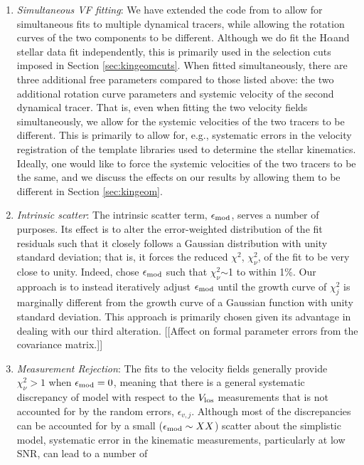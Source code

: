 \documentclass[apj,iop,revtex4,numberedappendix]{emulateapj}
\newcommand{\halpha}{H$\alpha$}
\begin{document}
\begin{enumerate}
%
\item {\em Simultaneous VF fitting}:  We have extended the code from
\citet{2013ApJ...768...41A} to allow for simultaneous fits to multiple
dynamical tracers, while allowing the rotation curves of the two
components to be different.  Although we do fit the \halpha and stellar
data fit independently, this is primarily used in the selection cuts
imposed in Section \ref{sec:kingeomcuts}.  When fitted simultaneously,
there are three additional free parameters compared to those listed
above: the two additional rotation curve parameters and systemic
velocity of the second dynamical tracer.  That is, even when fitting the
two velocity fields simultaneously, we allow for the systemic velocities
of the two tracers to be different.  This is primarily to allow for,
e.g., systematic errors in the velocity registration of the template
libraries used to determine the stellar kinematics.  Ideally, one would
like to force the systemic velocities of the two tracers to be the same,
and we discuss the effects on our results by allowing them to be
different in Section \ref{sec:kingeom}.
%
\item{\em Intrinsic scatter}:  The intrinsic scatter term,
$\epsilon_{\rm mod}$, serves a number of purposes.  Its effect is to
alter the error-weighted distribution of the fit residuals such that it
closely follows a Gaussian distribution with unity standard deviation;
that is, it forces the reduced $\chi^2$, $\chi^2_\nu$, of the fit to be
very close to unity.  Indeed, \citet{2013ApJ...768...41A} chose
$\epsilon_{\rm mod}$ such that $\chi^2_\nu$$\sim$1 to within 1\%.  Our
approach is to instead iteratively adjust $\epsilon_{\rm mod}$ until the
growth curve of $\chi^2_j$ is marginally different from the growth curve
of a Gaussian function with unity standard deviation.  This approach is
primarily chosen given its advantage in dealing with our third
alteration. [[Affect on formal parameter errors from the covariance
matrix.]]
%
\item{\em Measurement Rejection}:  The fits to the velocity fields
generally provide $\chi^2_\nu > 1$ when $\epsilon_{\rm mod} = 0$,
meaning that there is a general systematic discrepancy of model with
respect to the $V_{\rm los}$ measurements that is not accounted for by
the random errors, $\epsilon_{v,j}$.  Although most of the discrepancies
can be accounted for by a small ($\epsilon_{\rm mod}\sim XX$) scatter
about the simplistic model, systematic error in the kinematic
measurements, particularly at low SNR, can lead to a number of
$$
\end{enumerate}
\end{document}
